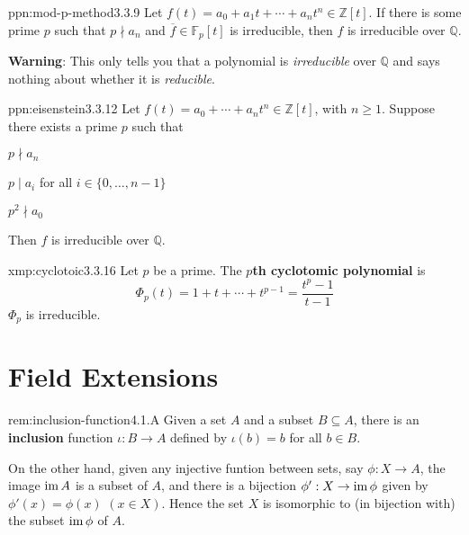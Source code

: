 \documentclass[landscape, 8pt]{extarticle}
\begin{document}
\begin{multicols}{3}
\begin{ppn}{ppn:mod-p-method}{3.3.9}
    Let $f(t) = a_{0} + a_{1}t + \cdots + a_{n}t^{n}\in \mathbb{Z}[t]$. If there is some prime $p$ such that $p \nmid a_{n}$ and $\overline{f} \in \mathbb{F}_{p}[t]$ is irreducible, then $f$ is irreducible over $\mathbb{Q}$.

    \textbf{Warning}: This only tells you that a polynomial is \textit{irreducible} over $\mathbb{Q}$ and says nothing about whether it is \textit{reducible}.
\end{ppn}

\begin{ppn}{ppn:eisenstein}{3.3.12}
    Let $f(t) = a_{0}+\cdots + a_{n}t^{n}\in \mathbb{Z}[t]$, with $n \ge 1$. Suppose there exists a prime $p$ such that
    \begin{itemize-tight}
        \item $p\nmid a_{n}$
        \item $p \mid a_{i}$ for all $i\in \{0,\dots, n - 1\}$
        \item $p^{2} \nmid a_{0}$
    \end{itemize-tight}
    Then $f$ is irreducible over $\mathbb{Q}$.
\end{ppn}


\begin{xmp}{xmp:cyclotoic}{3.3.16}
    Let $p$ be a prime. The \textbf{$p$th cyclotomic polynomial} is
    \[\Phi_{p}(t) = 1 + t + \cdots + t^{p-1} = \frac{t^{p} - 1}{t - 1}\]
    $\Phi_{p}$ is irreducible.
\end{xmp}

\section{Field Extensions}

\begin{rem}{rem:inclusion-function}{4.1.A}
    Given a set $A$ and a subset $B \subseteq A$, there is an \textbf{inclusion} function $\iota : B \to A$ defined by $\iota(b) = b$ for all $b\in B$.

    On the other hand, given any injective funtion between sets, say $\phi : X \to A$, the image $\operatorname{im} A$ is a subset of $A$, and there is a bijection $\phi' : X \to \operatorname{im} \phi$ given by $\phi'(x) = \phi(x)$ $(x\in X)$. Hence the set $X$ is isomorphic to (in bijection with) the subset $\operatorname{im} \phi$ of $A$.


\end{rem}
\end{multicols}
\end{document}
